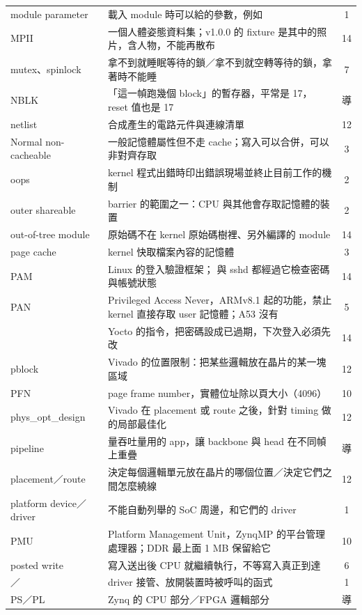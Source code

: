 \begin{xltabular}{\textwidth}{l X c}
module parameter & 載入 module 時可以給的參數，例如  & 1 \\
MPII & 一個人體姿態資料集；v1.0.0 的 fixture 是其中的照片，含人物，不能再散布 & 14 \\
mutex、spinlock & 拿不到就睡眠等待的鎖／拿不到就空轉等待的鎖，拿著時不能睡 & 7 \\
NBLK & 「這一幀跑幾個 block」的暫存器，平常是 17，reset 值也是 17 & 導 \\
netlist & 合成產生的電路元件與連線清單 & 12 \\
Normal non-cacheable & 一般記憶體屬性但不走 cache；寫入可以合併，可以非對齊存取 & 3 \\
oops & kernel 程式出錯時印出錯誤現場並終止目前工作的機制 & 2 \\
outer shareable & barrier 的範圍之一：CPU 與其他會存取記憶體的裝置 & 2 \\
out-of-tree module & 原始碼不在 kernel 原始碼樹裡、另外編譯的 module & 14 \\
page cache & kernel 快取檔案內容的記憶體 & 3 \\
PAM & Linux 的登入驗證框架； 與 sshd 都經過它檢查密碼與帳號狀態 & 14 \\
PAN & Privileged Access Never，ARMv8.1 起的功能，禁止 kernel 直接存取 user 記憶體；A53 沒有 & 5 \\
 & Yocto  的指令，把密碼設成已過期，下次登入必須先改 & 14 \\
pblock & Vivado 的位置限制：把某些邏輯放在晶片的某一塊區域 & 12 \\
PFN & page frame number，實體位址除以頁大小（4096） & 10 \\
phys\_opt\_design & Vivado 在 placement 或 route 之後，針對 timing 做的局部最佳化 & 12 \\
pipeline & 量吞吐量用的 app，讓 backbone 與 head 在不同幀上重疊 & 導 \\
placement／route & 決定每個邏輯單元放在晶片的哪個位置／決定它們之間怎麼繞線 & 12 \\
platform device／driver & 不能自動列舉的 SoC 周邊，和它們的 driver & 1 \\
PMU & Platform Management Unit，ZynqMP 的平台管理處理器；DDR 最上面 1 MB 保留給它 & 10 \\
posted write & 寫入送出後 CPU 就繼續執行，不等寫入真正到達 & 6 \\
／ & driver 接管、放開裝置時被呼叫的函式 & 1 \\
PS／PL & Zynq 的 CPU 部分／FPGA 邏輯部分 & 導 \\

\end{xltabular}
